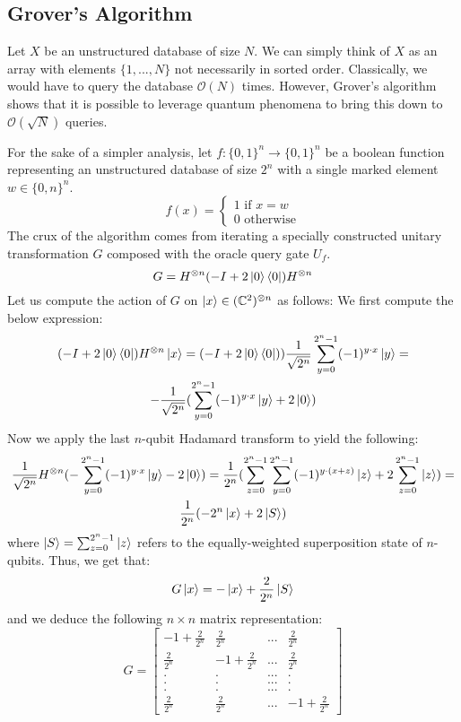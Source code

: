 \documentclass{../quantum.tex}
\begin{document}
\subsection{Grover's Algorithm}

Let $X$ be an unstructured database of size $N$. We can simply think of $X$ as an array with elements $\{1,...,N\}$ not necessarily in sorted order. Classically, we would have to query the database $\mathcal{O}(N)$ times. However, Grover's algorithm shows that it is possible to leverage quantum phenomena to bring this down to $\mathcal{O}(\sqrt{N})$ queries.

For the sake of a simpler analysis, let $f:\{0,1\}^n \rightarrow \{0,1\}^n$ be a boolean function representing an unstructured database of size $2^n$ with a single marked element $w \in \{0,n\}^n$.
$$ f(x) = \begin{cases}
            1 \text{ if } x = w \\
            0 \text{ otherwise}
          \end{cases} $$
The crux of the algorithm comes from iterating a specially constructed unitary transformation $G$ composed with the oracle query gate $U_f$.
$$ G = H^{\otimes n}(-I + 2\ket{0}\bra{0})H^{\otimes n} $$
Let us compute the action of $G$ on $\ket{x} \in (\mathbb{C}^2)^{\otimes n}$ as follows: We first compute the below expression:
\begin{gather}
(-I + 2\ket{0}\bra{0})H^{\otimes n} \ket{x} = (-I + 2\ket{0}\bra{0}))\frac{1}{\sqrt{2^n}}\sum_{y=0}^{2^n-1} (-1)^{y\cdot x}\ket{y} = \\
-\frac{1}{\sqrt{2^n}}(\sum_{y=0}^{2^n-1}(-1)^{y\cdot x}\ket{y} + 2\ket{0})
\end{gather}
Now we apply the last $n$-qubit Hadamard transform to yield the following:
\begin{gather}
  \frac{1}{\sqrt{2^n}}H^{\otimes n}(-\sum_{y=0}^{2^n-1}(-1)^{y\cdot x}\ket{y} - 2\ket{0}) = \frac{1}{2^n}(\sum_{z = 0}^{2^n-1} \sum_{y=0}^{2^n-1}(-1)^{y\cdot(x+z)} \ket{z} + 2 \sum_{z = 0}^{2^n-1} \ket{z}) = \\
  \frac{1}{2^n}(-2^n\ket{x} + 2 \ket{S})
\end{gather}
where $\ket{S} = \sum_{z = 0}^{2^n-1} \ket{z}$ refers to the equally-weighted superposition state of $n$-qubits.
Thus, we get that:
$$G\ket{x} = -\ket{x} + \frac{2}{2^n}\ket{S} $$
and we deduce the following $n\times n$ matrix representation:
$$G = \left[ \begin{matrix}
        -1 + \frac{2}{2^n} & \frac{2}{2^n} & ... & \frac{2}{2^n} \\
        \frac{2}{2^n} & -1 + \frac{2}{2^n} & ... & \frac{2}{2^n} \\
        . & . &  ... & . \\
        . & . &  ... & . \\
        . & . &  ... & . \\
        \frac{2}{2^n} & \frac{2}{2^n} & ... & -1 + \frac{2}{2^n}
      \end{matrix} \right]
 $$
\end{document}
